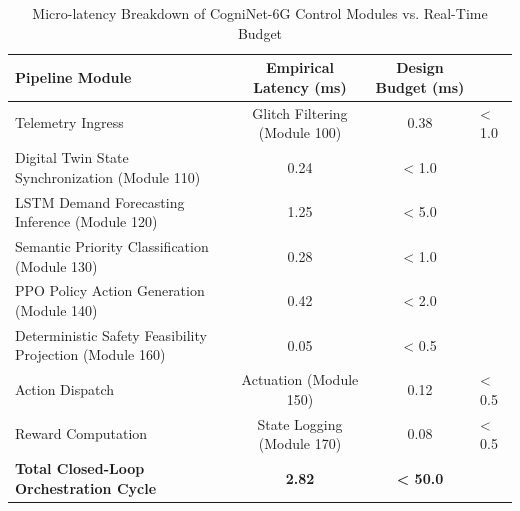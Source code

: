 \begin{table}[h]
\centering
\caption{Micro-latency Breakdown of CogniNet-6G Control Modules vs. Real-Time Budget}
\label{tab:timing_breakdown}
\begin{tabular}{lcc}
\toprule
\textbf{Pipeline Module} & \textbf{Empirical Latency (ms)} & \textbf{Design Budget (ms)} \\
\midrule
Telemetry Ingress & Glitch Filtering (Module 100) & 0.38 & < 1.0 \\
Digital Twin State Synchronization (Module 110) & 0.24 & < 1.0 \\
LSTM Demand Forecasting Inference (Module 120) & 1.25 & < 5.0 \\
Semantic Priority Classification (Module 130) & 0.28 & < 1.0 \\
PPO Policy Action Generation (Module 140) & 0.42 & < 2.0 \\
Deterministic Safety Feasibility Projection (Module 160) & 0.05 & < 0.5 \\
Action Dispatch & Actuation (Module 150) & 0.12 & < 0.5 \\
Reward Computation & State Logging (Module 170) & 0.08 & < 0.5 \\
\midrule
\textbf{Total Closed-Loop Orchestration Cycle} & \textbf{2.82} & \textbf{< 50.0} \\
\bottomrule
\end{tabular}
\end{table}